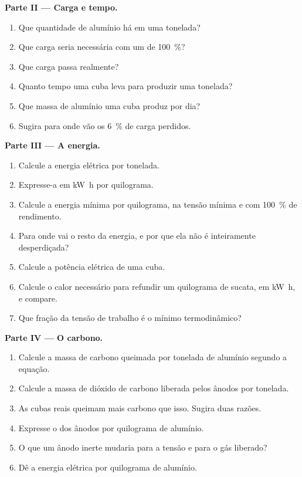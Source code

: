 \begin{problem}
\medskip
\noindent\textbf{Parte II --- Carga e tempo.}
\begin{enumerate}[resume]
  \item Que quantidade de alumínio há em uma tonelada?
  \item Que carga seria necessária com um  de 100~\%?
  \item Que carga passa realmente?
  \item Quanto tempo uma cuba leva para produzir uma tonelada?
  \item Que massa de alumínio uma cuba produz por dia?
  \item Sugira para onde vão os 6~\% de carga perdidos.
\end{enumerate}

\medskip
\noindent\textbf{Parte III --- A energia.}
\begin{enumerate}[resume]
  \item Calcule a energia elétrica por tonelada.
  \item Expresse-a em \unit{kW.h} por quilograma.
  \item Calcule a energia mínima por quilograma, na tensão mínima e com
        100~\% de rendimento.
  \item Para onde vai o resto da energia, e por que ela não é inteiramente
        desperdiçada?
  \item Calcule a potência elétrica de uma cuba.
  \item Calcule o calor necessário para refundir um quilograma de sucata, em
        \unit{kW.h}, e compare.
  \item Que fração da tensão de trabalho é o mínimo termodinâmico?
\end{enumerate}

\medskip
\noindent\textbf{Parte IV --- O carbono.}
\begin{enumerate}[resume]
  \item Calcule a massa de carbono queimada por tonelada de alumínio segundo
        a equação.
  \item Calcule a massa de dióxido de carbono liberada pelos ânodos por tonelada.
  \item As cubas reais queimam mais carbono que isso. Sugira duas razões.
  \item Expresse o  dos ânodos por quilograma de alumínio.
  \item O que um ânodo inerte mudaria para a tensão e para o gás liberado?
  \item Dê a energia elétrica por quilograma de alumínio.
\end{enumerate}
\end{problem}
